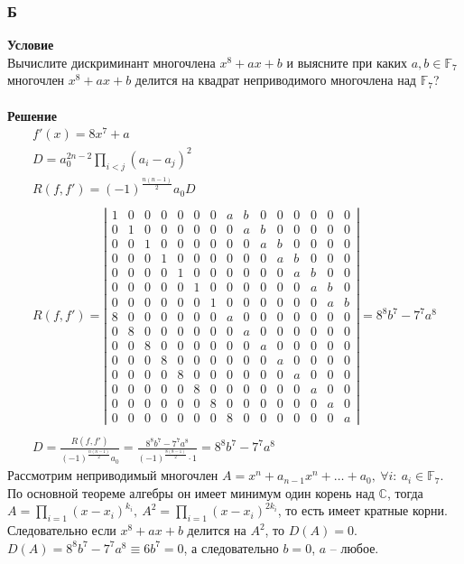	\subsubsection*{\textbf{Б}}
	\textbf{Условие}\\
	Вычислите дискриминант многочлена $x^8 + ax + b$ и выясните при каких $a,b \in \mathbb{F}_{7}$ многочлен $x^{8} + ax + b$ делится на квадрат неприводимого многочлена над $\mathbb{F}_{7}$?\\
	\\
	\textbf{Решение}
	\begin{gather*}
		f'(x) = 8x^7 + a\\
		D = a_{0}^{2n-2} \prod_{i<j}(a_i - a_j)^{2}\\
		R(f,f')= (-1)^{\frac{n(n-1)}{2}}a_{0}D\\
		\\
		R(f,f') = 
		\left|
		\begin{array}{ccccccccccccccc}
			1 & 0 & 0 & 0 & 0 & 0 & 0 & a & b & 0 & 0 & 0 & 0 & 0 & 0 \\
			0 & 1 & 0 & 0 & 0 & 0 & 0 & 0 & a & b & 0 & 0 & 0 & 0 & 0 \\
			0 & 0 & 1 & 0 & 0 & 0 & 0 & 0 & 0 & a & b & 0 & 0 & 0 & 0 \\
			0 & 0 & 0 & 1 & 0 & 0 & 0 & 0 & 0 & 0 & a & b & 0 & 0 & 0 \\
			0 & 0 & 0 & 0 & 1 & 0 & 0 & 0 & 0 & 0 & 0 & a & b & 0 & 0 \\
			0 & 0 & 0 & 0 & 0 & 1 & 0 & 0 & 0 & 0 & 0 & 0 & a & b & 0 \\
			0 & 0 & 0 & 0 & 0 & 0 & 1 & 0 & 0 & 0 & 0 & 0 & 0 & a & b \\
			8 & 0 & 0 & 0 & 0 & 0 & 0 & a & 0 & 0 & 0 & 0 & 0 & 0 & 0 \\
			0 & 8 & 0 & 0 & 0 & 0 & 0 & 0 & a & 0 & 0 & 0 & 0 & 0 & 0 \\
			0 & 0 & 8 & 0 & 0 & 0 & 0 & 0 & 0 & a & 0 & 0 & 0 & 0 & 0 \\
			0 & 0 & 0 & 8 & 0 & 0 & 0 & 0 & 0 & 0 & a & 0 & 0 & 0 & 0 \\
			0 & 0 & 0 & 0 & 8 & 0 & 0 & 0 & 0 & 0 & 0 & a & 0 & 0 & 0 \\
			0 & 0 & 0 & 0 & 0 & 8 & 0 & 0 & 0 & 0 & 0 & 0 & a & 0 & 0 \\
			0 & 0 & 0 & 0 & 0 & 0 & 8 & 0 & 0 & 0 & 0 & 0 & 0 & a & 0 \\
			0 & 0 & 0 & 0 & 0 & 0 & 0 & 8 & 0 & 0 & 0 & 0 & 0 & 0 & a
		\end{array}
		\right|
		=
		8^{8}b^7 - 7^{7} a^8\\
		\\
		D = \frac{R(f,f')}{(-1)^{\frac{n(n-1)}{2}} a_0} = \frac{8^{8}b^7 - 7^{7} a^8}{(-1)^{\frac{8(8-1)}{2}} \cdot 1} = 8^{8}b^7 - 7^{7} a^8
	\end{gather*}
	Рассмотрим неприводимый многочлен $A = x^n + a_{n-1} x^n + \ldots + a_{0},\ \forall i:\ a_i \in \mathbb{F}_7$. По основной теореме алгебры он имеет минимум один корень над $\mathbb{C}$, тогда $A = \prod_{i = 1} (x - x_i)^{k_i},\ A^2 = \prod_{i = 1} (x - x_i)^{2k_i}$, то есть имеет кратные корни. Следовательно если $x^8 + ax + b$ делится на $A^2$, то $D(A) = 0$.
	$D(A) = 8^8b^7 - 7^7a^8 \equiv 6b^7 = 0$, а следовательно $b = 0$, $a$ -- любое.\\

	